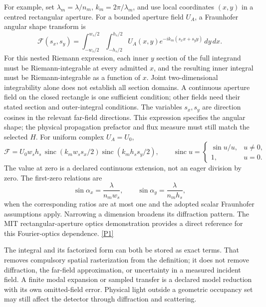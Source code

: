 For example, set $\lambda_m=\lambda/n_m$, $k_m=2\pi/\lambda_m$, and use local
coordinates $(x,y)$ in a centred rectangular aperture. For a bounded aperture
field $U_A$, a Fraunhofer angular shape transform is
\begin{equation}
 \mathcal F(s_x,s_y)=
 \int_{-w_s/2}^{w_s/2}\!\int_{-h_s/2}^{h_s/2}
 U_A(x,y)e^{-ik_m(s_xx+s_yy)}\,dy\,dx.
 \label{eq:want-fraunhofer}
\end{equation}
For this nested Riemann expression, each inner $y$ section of the full
integrand must be Riemann-integrable at every admitted $x$, and the resulting
inner integral must be Riemann-integrable as a function of $x$. Joint
two-dimensional integrability alone does not establish all section domains.
A continuous aperture field on the closed rectangle is one sufficient
condition; other fields need their stated section and outer-integral
conditions. The variables $s_x,s_y$ are direction cosines in the relevant far-field
directions. This expression specifies the angular shape; the physical
propagation prefactor and flux measure must still match the selected $H$.
For uniform complex $U_A=U_0$,
\begin{equation}
 \mathcal F=U_0w_sh_s\,\operatorname{sinc}(k_mw_ss_x/2)
                  \operatorname{sinc}(k_mh_ss_y/2),\qquad
 \operatorname{sinc}u=
 \begin{cases}\sin u/u,&u\ne0,\\1,&u=0.\end{cases}
 \label{eq:want-sinc}
\end{equation}
The value at zero is a declared continuous extension, not an eager division by
zero. The first-zero relations are
\begin{equation}
 \sin\alpha_x=\frac{\lambda}{n_mw_s},\qquad
 \sin\alpha_y=\frac{\lambda}{n_mh_s},
 \label{eq:want-first-zero}
\end{equation}
when the corresponding ratios are at most one and the adopted scalar
Fraunhofer assumptions apply. Narrowing a dimension broadens its diffraction
pattern. The MIT rectangular-aperture optics demonstration provides a direct
reference for this Fourier-optics dependence.
\href{https://ocw.mit.edu/courses/res-6-006-video-demonstrations-in-lasers-and-optics-spring-2008/e06ca88aa4b673d48884b8705496a1b7_4YPxRTFxy2A.pdf}{[P1]}

The integral and its factorized form can both be stored as exact terms. That
removes compulsory spatial rasterization from the definition; it does not
remove diffraction, the far-field approximation, or uncertainty in a measured
incident field. A finite modal expansion or sampled transfer is a declared
model reduction with its own omitted-field error. Physical light outside a
geometric occupancy set may still affect the detector through diffraction and
scattering.

